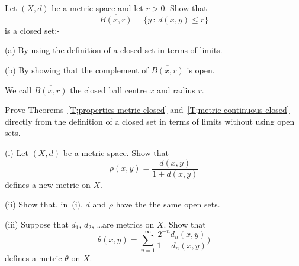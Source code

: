 \begin{exercise} Let $(X,d)$ be a metric space
and let $r>0$.
Show that
\[\overline{B(x,r)}=\{y\,:\,d(x,y)\leq r\}\]
is a closed set:-

(a) By using the definition of a closed set in terms of limits.

(b) By showing that the complement of $\overline{B(x,r)}$
is open.

We call $\overline{B(x,r)}$ the closed ball centre $x$ and radius
$r$.
\end{exercise}
\begin{exercise} Prove Theorems~\ref{T;properties metric closed}
and~\ref{T;metric continuous closed}
directly from 
the definition of a closed set in terms of limits
without using open sets.
\end{exercise}
\begin{exercise}\label{E;new metrics}
(i) Let $(X,d)$ be a metric space. Show that
\[\rho(x,y)=\frac{d(x,y)}{1+d(x,y)}\]
defines a new metric on $X$.
                                                                               
(ii) Show that, in~(i), $d$ and $\rho$ have the
the same open sets.
                                                                            
(iii) Suppose that $d_{1}$, $d_{2}$, \dots are metrics
on $X$. Show that
\[\theta(x,y)=\sum_{n=1}^{\infty}
\frac{2^{-n}d_{n}(x,y)}{1+d_{n}(x,y)})\]
defines a metric $\theta$ on $X$.
\end{exercise}

